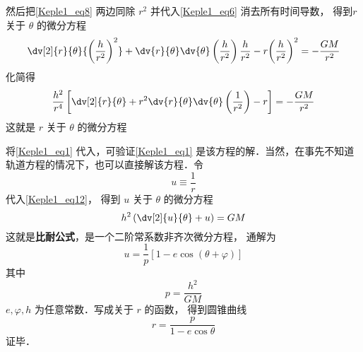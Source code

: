 然后把\autoref{Keple1_eq8} 两边同除 $r^2$ 并代入\autoref{Keple1_eq6} 消去所有时间导数，
得到$r$ 关于 $\theta$ 的微分方程
\begin{equation}
\dv[2]{r}{\theta}{\left( {\frac{h}{{{r^2}}}} \right)^2} + \dv{r}{\theta}\dv{\theta}\left( {\frac{h}{{{r^2}}}} \right)\frac{h}{{{r^2}}} - r{\left( {\frac{h}{{{r^2}}}} \right)^2} =  - \frac{{GM}}{{{r^2}}}
\end{equation}
化简得
\begin{equation}\label{Keple1_eq12}
\frac{{{h^2}}}{{{r^4}}}\left[ {\dv[2]{r}{\theta} + r^2\dv{r}{\theta}\dv{\theta}\left( {\frac{1}{{{r^2}}}} \right) - r} \right] =  - \frac{{GM}}{{{r^2}}}
\end{equation}
这就是 $r$ 关于 $\theta $ 的微分方程

将\autoref{Keple1_eq1} 代入，可验证\autoref{Keple1_eq1} 是该方程的解．当然，在事先不知道轨道方程的情况下，也可以直接解该方程．令
\begin{equation}\label{Keple1_eq13}
u \equiv \frac{1}{r}
\end{equation}
代入\autoref{Keple1_eq12}，  得到 $u$ 关于 $\theta $ 的微分方程
\begin{equation}\label{Keple1_eq15}
{h^2}\left( {\dv[2]{u}{\theta} + u} \right) =  GM
\end{equation}
这就是\textbf{比耐公式}，是一个二阶常系数非齐次微分方程，
通解为
\begin{equation}
u = \frac{1}{p}\left[1 - e\cos(\theta  + \varphi)\right]
\end{equation}
其中
\begin{equation}
p = \frac{h^2}{GM}
\end{equation}
$e, \varphi, h$ 为任意常数．写成关于 $r$ 的函数， 得到圆锥曲线
\begin{equation}\label{Keple1_eq16}
r = \frac{p}{{1 - e \cos \theta }}
\end{equation}
证毕．
